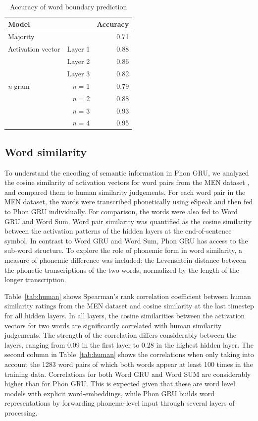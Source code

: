 \begin{table}[]
	\centering
	\begin{tabular}{lrr}
		Model & & Accuracy \\\hline
                Majority & & 0.71 \\
		\hline
		Activation vector & Layer 1 & 0.88 \\
		& Layer 2 & 0.86 \\
		& Layer 3 & 0.82 \\
		\hline
		\textit{n}-gram & \textit{n} = 1 & 0.79 \\
		& \textit{n} = 2 & 0.88 \\
		& \textit{n} = 3 & 0.93 \\
		& \textit{n} = 4 & 0.95
	\end{tabular}
	\caption{Accuracy of word boundary prediction}
\label{tab:boundary}
\end{table}

\subsection{Word similarity}
To understand the encoding of semantic information in {\sc Phon GRU}, we analyzed the cosine similarity of activation vectors for word pairs from the MEN dataset \cite{bruni2014multimodal}, and compared them to human similarity judgements.
For each word pair in the MEN dataset, the words were transcribed phonetically using eSpeak and then fed to {\sc Phon GRU} individually. For comparison, the words were also fed to {\sc Word GRU} and {\sc Word Sum}. Word pair similarity was quantified as the cosine similarity between the activation patterns of the hidden layers at the end-of-sentence symbol.
In contrast to {\sc Word GRU} and {\sc Word Sum}, {\sc Phon GRU} has access to the sub-word structure. To explore the role of phonemic form in word similarity, a measure of phonemic difference was included: the Levenshtein distance between the phonetic transcriptions of the two words, normalized by  the length of the longer transcription. 

Table~\ref{tab:human} shows Spearman's rank correlation coefficient between human similarity ratings from the MEN dataset and cosine similarity at the last timestep for all hidden layers. In all layers, the cosine similarities between the activation vectors for two words are significantly correlated with human similarity judgements. The strength of the correlation differs considerably between the layers, ranging from 0.09 in the first layer to 0.28 in the highest hidden layer. The second column in Table~\ref{tab:human} shows the correlations when only taking into account the 1283 word pairs of which both words appear at least 100 times in the training data. 
Correlations for both {\sc Word GRU} and {\sc Word SUM} are considerably higher than for {\sc Phon GRU}. This is expected given that these are word level models with explicit word-embeddings, while {\sc Phon GRU} builds word representations by forwarding phoneme-level input through several layers of processing.

